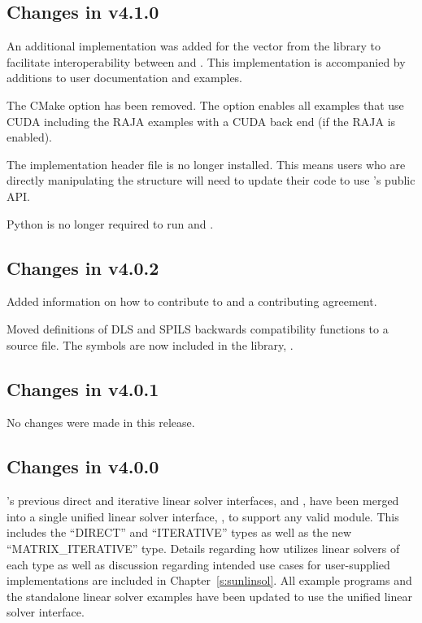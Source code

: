 \subsection*{Changes in v4.1.0}

An additional {\nvector} implementation was added for the
{\tpetra} vector from the {\trilinos} library to facilitate interoperability
between {\sundials} and {\trilinos}. This implementation is accompanied by
additions to user documentation and {\sundials} examples.

The  CMake option has been removed. The option 
enables all examples that use CUDA including the RAJA examples with a CUDA back end (if the RAJA
{\nvector} is enabled).

The implementation header file  is no longer installed. This means users
who are directly manipulating the  structure will need to update their code
to use {\kinsol}'s public API.

Python is no longer required to run  and .

\subsection*{Changes in v4.0.2}

Added information on how to contribute to {\sundials} and a contributing agreement.

Moved definitions of DLS and SPILS backwards compatibility functions to a source file.
The symbols are now included in the {\kinsol} library, .

\subsection*{Changes in v4.0.1}

No changes were made in this release.

\subsection*{Changes in v4.0.0}

{\kinsol}'s previous direct and iterative linear solver interfaces,
{\kindls} and {\kinspils}, have been merged into a single unified linear
solver interface, {\kinls}, to support any valid {\sunlinsol} module.
This includes the ``DIRECT'' and ``ITERATIVE'' types as well as the new
``MATRIX\_ITERATIVE'' type. Details regarding how {\kinls} utilizes linear
solvers of each type as well as discussion regarding intended use cases for
user-supplied {\sunlinsol} implementations are included in
Chapter~\ref{s:sunlinsol}. All {\kinsol} example programs and the standalone
linear solver examples have been updated to use the unified linear solver
interface.

